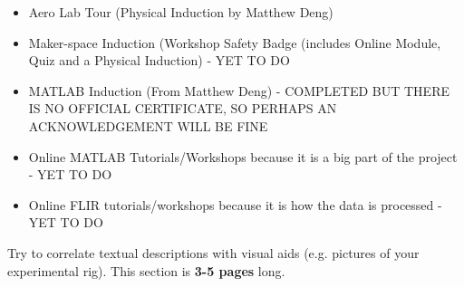 \begin{itemize}
\begin{itemize}
        \item Aero Lab Tour (Physical Induction by Matthew Deng)
        \item Maker-space Induction (Workshop Safety Badge (includes Online Module, Quiz and a Physical Induction) - YET TO DO
        \item MATLAB Induction (From Matthew Deng) - COMPLETED BUT THERE IS NO OFFICIAL CERTIFICATE, SO PERHAPS AN ACKNOWLEDGEMENT WILL BE FINE
        \item Online MATLAB Tutorials/Workshops because it is a big part of the project - YET TO DO
        \item Online FLIR tutorials/workshops because it is how the data is processed - YET TO DO
    \end{itemize}
\end{itemize}
Try to correlate textual descriptions with visual aids (e.g. pictures of your experimental rig).
This section is \textbf{3-5 pages} long. 

\pagebreak